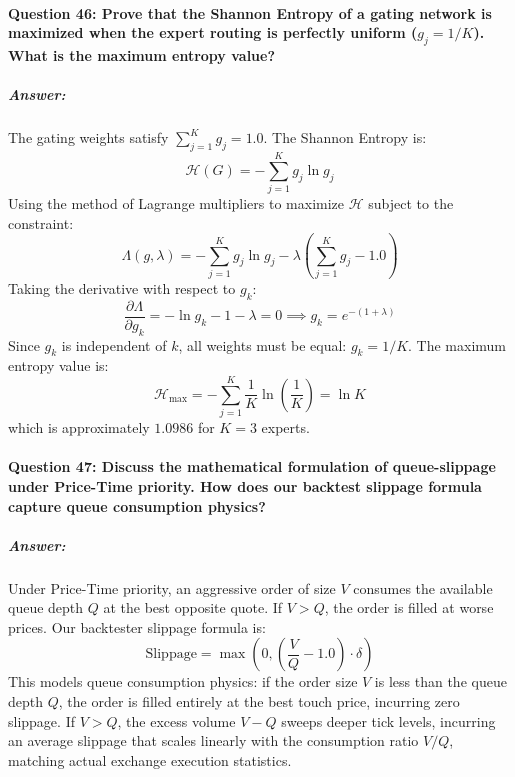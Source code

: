 \documentclass[11pt,a4paper]{article}
\begin{document}
\paragraph{Question 46: Prove that the Shannon Entropy of a gating network is maximized when the expert routing is perfectly uniform ($g_j = 1/K$). What is the maximum entropy value?}
\subparagraph{Answer:}
The gating weights satisfy $\sum_{j=1}^K g_j = 1.0$. The Shannon Entropy is:
\begin{equation}
    \mathcal{H}(G) = - \sum_{j=1}^K g_j \ln g_j
\end{equation}
Using the method of Lagrange multipliers to maximize $\mathcal{H}$ subject to the constraint:
\begin{equation}
    \Lambda(g, \lambda) = - \sum_{j=1}^K g_j \ln g_j - \lambda \left( \sum_{j=1}^K g_j - 1.0 \right)
\end{equation}
Taking the derivative with respect to $g_k$:
\begin{equation}
    \frac{\partial \Lambda}{\partial g_k} = - \ln g_k - 1 - \lambda = 0 \implies g_k = e^{-(1 + \lambda)}
\end{equation}
Since $g_k$ is independent of $k$, all weights must be equal: $g_k = 1/K$. The maximum entropy value is:
\begin{equation}
    \mathcal{H}_{\max} = - \sum_{j=1}^K \frac{1}{K} \ln\left(\frac{1}{K}\right) = \ln K
\end{equation}
which is approximately $1.0986$ for $K=3$ experts.

\paragraph{Question 47: Discuss the mathematical formulation of queue-slippage under Price-Time priority. How does our backtest slippage formula capture queue consumption physics?}
\subparagraph{Answer:}
Under Price-Time priority, an aggressive order of size $V$ consumes the available queue depth $Q$ at the best opposite quote. If $V > Q$, the order is filled at worse prices. Our backtester slippage formula is:
\begin{equation}
    \text{Slippage} = \max\left( 0, \left( \frac{V}{Q} - 1.0 \right) \cdot \delta \right)
\end{equation}
This models queue consumption physics: if the order size $V$ is less than the queue depth $Q$, the order is filled entirely at the best touch price, incurring zero slippage. If $V > Q$, the excess volume $V - Q$ sweeps deeper tick levels, incurring an average slippage that scales linearly with the consumption ratio $V/Q$, matching actual exchange execution statistics.
\end{document}
